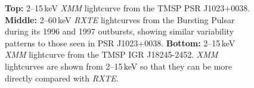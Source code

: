 \begin{figure}
 \centering
 \caption[Lightcurves from the Bursting Pulsar and from two TMSPs, showing similar patterns of variability.]{\textbf{Top:} 2--15\,keV \textit{XMM} lightcurve from the TMSP PSR J1023+0038. \textbf{Middle:} 2--60\,keV \textit{RXTE} lightcurves from the Bursting Pulsar during its 1996 and 1997 outbursts, showing similar variability patterns to those seen in PSR J1023+0038. \textbf{Bottom:} 2--15\,keV \textit{XMM} lightcurve from the TMSP IGR J18245-2452. \textit{XMM} lightcurves are shown from 2--15\,keV so that they can be more directly compared with \textit{RXTE}.}
 \label{fig:lcs}
\end{figure}

